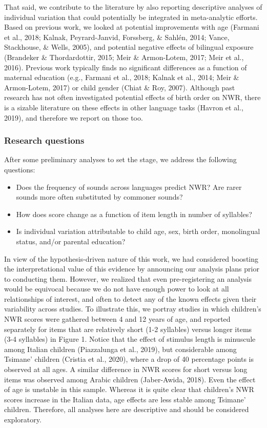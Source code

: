 \documentclass[english,,man,floatsintext]{apa6}
\providecommand{\tightlist}{%
  \setlength{\itemsep}{0pt}\setlength{\parskip}{0pt}}
\begin{document}
That said, we contribute to the literature by also reporting descriptive
analyses of individual variation that could potentially be integrated in
meta-analytic efforts. Based on previous work, we looked at potential
improvements with age (Farmani et al., 2018; Kalnak, Peyrard-Janvid,
Forssberg, \& Sahlén, 2014; Vance, Stackhouse, \& Wells, 2005), and
potential negative effects of bilingual exposure (Brandeker \&
Thordardottir, 2015; Meir \& Armon-Lotem, 2017; Meir et al., 2016).
Previous work typically finds no significant differences as a function
of maternal education (e.g., Farmani et al., 2018; Kalnak et al., 2014;
Meir \& Armon-Lotem, 2017) or child gender (Chiat \& Roy, 2007).
Although past research has not often investigated potential effects of
birth order on NWR, there is a sizable literature on these effects in
other language tasks (Havron et al., 2019), and therefore we report on
those too.

\subsubsection{Research questions}\label{research-questions}

After some preliminary analyses to set the stage, we address the
following questions:

\begin{itemize}
\tightlist
\item
  Does the frequency of sounds across languages predict NWR? Are rarer
  sounds more often substituted by commoner sounds?
\item
  How does score change as a function of item length in number of
  syllables?
\item
  Is individual variation attributable to child age, sex, birth order,
  monolingual status, and/or parental education? 
\end{itemize}

In view of the hypothesis-driven nature of this work, we had considered
boosting the interpretational value of this evidence by announcing our
analysis plans prior to conducting them. However, we realized that even
pre-registering an analysis would be equivocal because we do not have
enough power to look at all relationships of interest, and often to
detect any of the known effects given their variability across studies.
To illustrate this, we portray studies in which children's NWR scores
were gathered between 4 and 12 years of age, and reported separately for
items that are relatively short (1-2 syllables) versus longer items (3-4
syllables) in Figure 1. Notice that the effect of stimulus length is
minuscule among Italian children (Piazzalunga et al., 2019), but
considerable among Tsimane' children (Cristia et al., 2020), where a
drop of 40 percentage points is observed at all ages. A similar
difference in NWR scores for short versus long items was observed among
Arabic children (Jaber-Awida, 2018). Even the effect of age is unstable
in this sample. Whereas it is quite clear that children's NWR scores
increase in the Italian data, age effects are less stable among Tsimane'
children. Therefore, all analyses here are descriptive and should be
considered exploratory.
\end{document}
